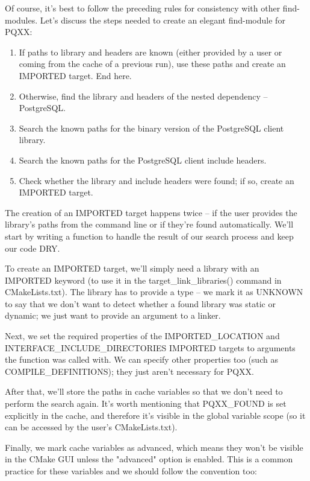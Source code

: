 Of course, it's best to follow the preceding rules for consistency with other find-modules. Let's discuss the steps needed to create an elegant find-module for PQXX:

\begin{enumerate}
\item 
If paths to library and headers are known (either provided by a user or coming from the cache of a previous run), use these paths and create an IMPORTED target. End here.

\item 
Otherwise, find the library and headers of the nested dependency – PostgreSQL.

\item 
Search the known paths for the binary version of the PostgreSQL client library.

\item 
Search the known paths for the PostgreSQL client include headers.

\item 
Check whether the library and include headers were found; if so, create an IMPORTED target.
\end{enumerate}

The creation of an IMPORTED target happens twice – if the user provides the library's paths from the command line or if they're found automatically. We'll start by writing a function to handle the result of our search process and keep our code DRY.

To create an IMPORTED target, we'll simply need a library with an IMPORTED keyword (to use it in the target\_link\_libraries() command in CMakeLists.txt). The library has to provide a type – we mark it as UNKNOWN to say that we don't want to detect whether a found library was static or dynamic; we just want to provide an argument to a linker.

Next, we set the required properties of the IMPORTED\_LOCATION and INTERFACE\_INCLUDE\_DIRECTORIES IMPORTED targets to arguments the function was called with. We can specify other properties too (such as COMPILE\_DEFINITIONS); they just aren't necessary for PQXX.

After that, we'll store the paths in cache variables so that we don't need to perform the search again. It's worth mentioning that PQXX\_FOUND is set explicitly in the cache, and therefore it's visible in the global variable scope (so it can be accessed by the user's CMakeLists.txt).

Finally, we mark cache variables as advanced, which means they won't be visible in the CMake GUI unless the "advanced" option is enabled. This is a common practice for these variables and we should follow the convention too:

